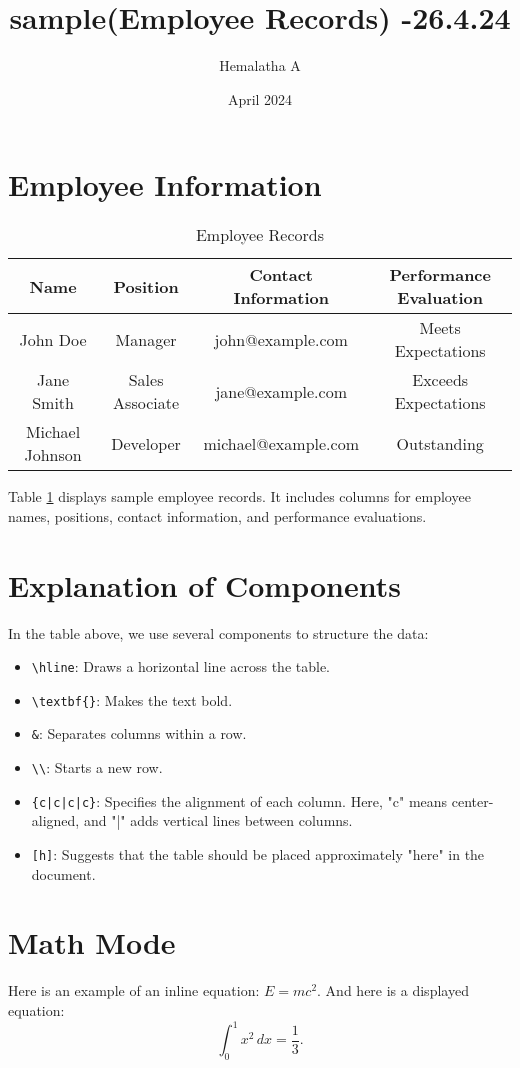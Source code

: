 \documentclass{article}
\title{sample(Employee Records) -26.4.24}
\author{Hemalatha A}
\date{April 2024}
\begin{document}
\maketitle
\section{Employee Information}
\begin{table}[h]
\centering
\begin{tabular}{|c|c|c|c|}
\hline
\textbf{Name} & \textbf{Position} & \textbf{Contact Information} & \textbf{Performance Evaluation} \\
\hline
John Doe & Manager & john@example.com & Meets Expectations \\
\hline
Jane Smith & Sales Associate & jane@example.com & Exceeds Expectations \\
\hline
Michael Johnson & Developer & michael@example.com & Outstanding \\
\hline
\end{tabular}
\caption{Employee Records}
\label{tab:Employee Records}
\end{table}
Table \ref{tab:Employee Records} displays sample employee records. It includes columns for employee names, positions, contact information, and performance evaluations.

\section{Explanation of Components}
In the table above, we use several components to structure the data:
\begin{itemize}
  \item \texttt{\textbackslash hline}: Draws a horizontal line across the table.
  \item \texttt{\textbackslash textbf\{\}}: Makes the text bold.
  \item \texttt{\&}: Separates columns within a row.
  \item \texttt{\textbackslash\textbackslash}: Starts a new row.
  \item \texttt{\{c|c|c|c\}}: Specifies the alignment of each column. Here, "c" means center-aligned, and "|" adds vertical lines between columns.
  \item \texttt{[h]}: Suggests that the table should be placed approximately "here" in the document.
\end{itemize}

\section{Math Mode}
\label{sec:math}
Here is an example of an inline equation: $E=mc^2$.
And here is a displayed equation:
\[
    \int_{0}^{1} x^2 \, dx = \frac{1}{3}.
\]
\end{document}

